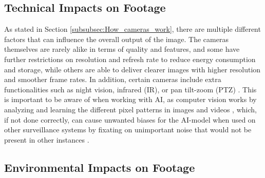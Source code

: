 \subsection{Technical Impacts on Footage}
\label{subsec:TechnicalImpactFootage}
As stated in Section \ref{subsubsec:How_cameras_work}, there are multiple different factors that can influence the overall output of the image. The cameras themselves are rarely alike in terms of quality and features, and some have further restrictions on resolution and refresh rate to reduce energy consumption and storage, while others are able to deliver clearer images with higher resolution and smoother frame rates. In addition, certain cameras include extra functionalities such as night vision, infrared (\acs{IR}), or pan tilt-zoom (\acs{PTZ}) \cite{nightvision_enhancement2018} \cite{ucocare2024SurvilanceCameraFunction}. This is important to be aware of when working with \ac{AI}, as computer vision works by analyzing and learning the different pixel patterns in images and videos \cite{common_challenges_image_class2024}, which, if not done correctly, can cause unwanted biases for the \acs{AI}-model when used on other surveillance systems by fixating on unimportant noise that would not be present in other instances \cite{opencv2025visionproblems}.

\subsection{Environmental Impacts on Footage}

